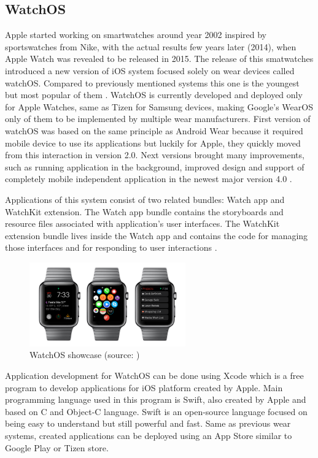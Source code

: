 \subsection{WatchOS}\label{sec:WatchOS}
Apple started working on smartwatches around year 2002 inspired by sportswatches from Nike, with the actual results few years later (2014), when Apple Watch was revealed to be released in 2015. The release of this smatwatches introduced a new version of iOS system focused solely on wear devices called watchOS. Compared to previously mentioned systems this one is the youngest but most popular of them \cite{ATOHAWWC}. WatchOS is currently developed and deployed only for Apple Watches, same as Tizen for Samsung devices, making Google's WearOS only of them to be implemented by multiple wear manufacturers. First version of watchOS was based on the same principle as Android Wear because it required mobile device to use its applications but luckily for Apple, they quickly moved from this interaction in version 2.0. Next versions brought many improvements, such as running application in the background, improved design and support of completely mobile independent application in the newest major version 4.0 \cite{WOS9To5MAC}.

Applications of this system consist of two related bundles: Watch app and WatchKit extension. The Watch app bundle contains the storyboards and resource files associated with application's user interfaces. The WatchKit extension bundle lives inside the Watch app and contains the code for managing those interfaces and for responding to user interactions \cite{AppleDev}.

\begin{figure}[H]
	\begin{centering}
		\includegraphics[width=0.6\textwidth]{img/apple_watchOs}
		\par\end{centering}
	\caption{WatchOS showcase (source: \cite{HTFAIAAW})\label{fig:WatchOS}}
	\label{fig06c04}
\end{figure}

Application development for WatchOS can be done using Xcode which is a free program to develop applications for iOS platform created by Apple. Main programming language used in this program is Swift, also created by Apple and based on C and Object-C language. Swift is an open-source language focused on being easy to understand but still powerful and fast. Same as previous wear systems, created applications can be deployed using an App Store similar to Google Play or Tizen store.